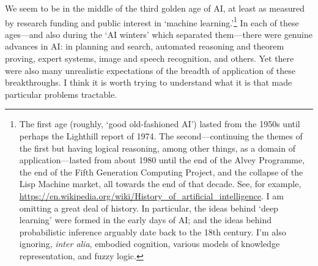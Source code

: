 \documentclass[10pt, a4paper, twocolumn]{article}
\begin{document}
We seem to be in the middle of the third golden age of AI, at least as measured
by research funding and public interest in `machine learning.'\footnote{The
first age (roughly, `good old-fashioned AI') lasted from the 1950s until perhaps
the Lighthill report of 1974. The second---continuing the themes of the first but
having logical reasoning, among other things, as a domain of application---lasted
from about 1980 until the end of the Alvey Programme, the end of the Fifth
Generation Computing Project, and the collapse of the Lisp Machine market, all
towards the end of that decade. See, for example,
\url{https://en.wikipedia.org/wiki/History_of_artificial_intelligence}. I am
omitting a great deal of history. In particular, the ideas behind `deep
learning' were formed in the early days of AI; and the ideas behind
probabilistic inference arguably date back to the 18th century. I'm also
ignoring, \emph{inter alia}, embodied cognition, various models of knowledge
representation, and fuzzy logic.} In each of these ages---and also during the `AI
winters' which separated them---there were genuine advances in AI: in planning and
search, automated reasoning and theorem proving, expert systems, image and
speech recognition, and others. Yet there were also many unrealistic
expectations of the breadth of application of these breakthroughs. I think it is
worth trying to understand what it is that made particular problems
tractable.
\end{document}
